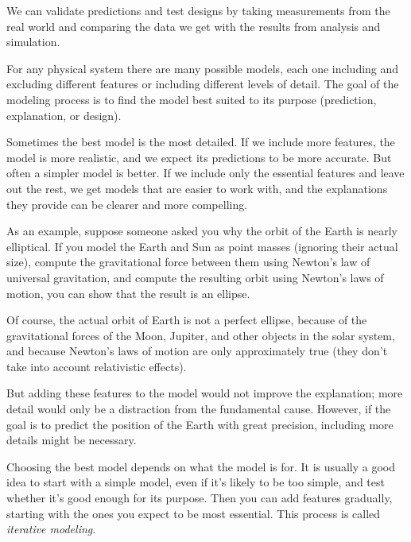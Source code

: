 \documentclass[../../book.tex]{subfiles}
\begin{document}

We can validate predictions and test designs by taking measurements from the real world and comparing the data we get with the results from analysis and simulation.


For any physical system there are many possible models, each one including and excluding different features or including different levels of detail.  The goal of the modeling process is to find the model best suited to its purpose (prediction, explanation, or design).


Sometimes the best model is the most detailed.  If we include more features, the model is more realistic, and we expect its predictions to be more accurate. 
But often a simpler model is better.  If we include only the essential features and leave out the rest, we get models that are easier to work with, and the explanations they provide can be clearer and more compelling. 

As an example, suppose someone asked you why the orbit of the Earth is nearly elliptical.  If you model the Earth and Sun as point masses (ignoring their actual size), compute the gravitational force between them using Newton's law of universal gravitation, and compute the resulting orbit  using Newton's laws of motion, you can show that the result is an ellipse.

Of course, the actual orbit of Earth is not a perfect ellipse, because of the gravitational forces of the Moon, Jupiter, and other objects in the solar system, and because Newton's laws of motion are only approximately true (they don't take into account relativistic effects).
%
%

But adding these features to the model would not improve the explanation; more detail would only be a distraction from the fundamental cause.  However, if the goal is to predict the position of the Earth with great precision, including more details might be necessary.

Choosing the best model depends on what the model is for.  It is usually a good idea to start with a simple model, even if it's likely to be too simple, and test whether it's good enough for its purpose.  Then you can add features gradually, starting with the ones you expect to be most essential.  This process is called \emph{iterative modeling}.
\end{document}
